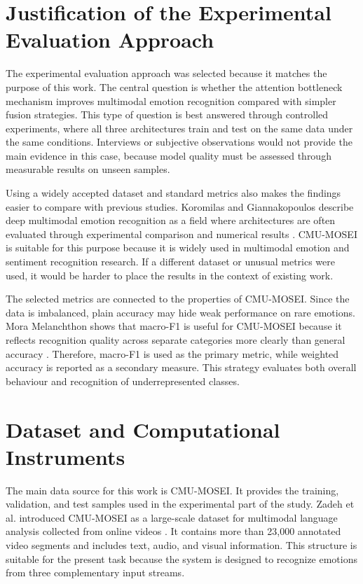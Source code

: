 \section{Justification of the Experimental Evaluation Approach}
\label{sec:methodology_justification}

The experimental evaluation approach was selected because it matches the purpose of this work. The central question is whether the attention bottleneck mechanism improves multimodal emotion recognition compared with simpler fusion strategies. This type of question is best answered through controlled experiments, where all three architectures train and test on the same data under the same conditions. Interviews or subjective observations would not provide the main evidence in this case, because model quality must be assessed through measurable results on unseen samples.

Using a widely accepted dataset and standard metrics also makes the findings easier to compare with previous studies. Koromilas and Giannakopoulos describe deep multimodal emotion recognition as a field where architectures are often evaluated through experimental comparison and numerical results \cite{koromilas2021deep}. CMU-MOSEI is suitable for this purpose because it is widely used in multimodal emotion and sentiment recognition research. If a different dataset or unusual metrics were used, it would be harder to place the results in the context of existing work.

The selected metrics are connected to the properties of CMU-MOSEI. Since the data is imbalanced, plain accuracy may hide weak performance on rare emotions. Mora Melanchthon shows that macro-F1 is useful for CMU-MOSEI because it reflects recognition quality across separate categories more clearly than general accuracy \cite{mora2021unimodal}. Therefore, macro-F1 is used as the primary metric, while weighted accuracy is reported as a secondary measure. This strategy evaluates both overall behaviour and recognition of underrepresented classes.

\section{Dataset and Computational Instruments}
\label{sec:research_instruments}

The main data source for this work is CMU-MOSEI. It provides the training, validation, and test samples used in the experimental part of the study. Zadeh et al. introduced CMU-MOSEI as a large-scale dataset for multimodal language analysis collected from online videos \cite{zadeh2018multimodal}. It contains more than 23,000 annotated video segments and includes text, audio, and visual information. This structure is suitable for the present task because the system is designed to recognize emotions from three complementary input streams.

